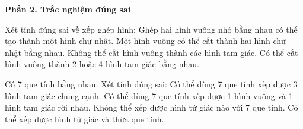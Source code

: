 \textbf{Phần 2. Trắc nghiệm đúng sai}

\begin{ex} %
Xét tính đúng sai về xếp ghép hình:
\choiceTF
{\True Ghép hai hình vuông nhỏ bằng nhau có thể tạo thành một hình chữ nhật.}
{\True Một hình vuông có thể cắt thành hai hình chữ nhật bằng nhau.}
{Không thể cắt hình vuông thành các hình tam giác.}
{\True Có thể cắt hình vuông thành 2 hoặc 4 hình tam giác bằng nhau.}
\end{ex}

\begin{ex} %
Có 7 que tính bằng nhau. Xét tính đúng sai:
\choiceTF
{\True Có thể dùng 7 que tính xếp được 3 hình tam giác chung cạnh.}
{\True Có thể dùng 7 que tính xếp được 1 hình vuông và 1 hình tam giác rời nhau.}
{Không thể xếp được hình tứ giác nào với 7 que tính.}
{\True Có thể xếp được hình tứ giác và thừa que tính.}
\end{ex}

